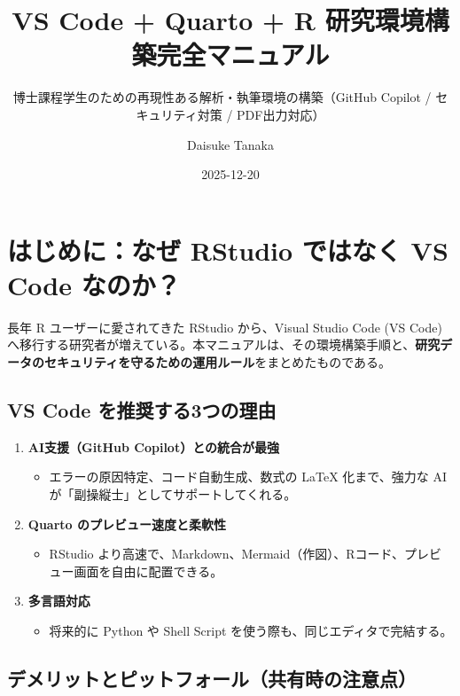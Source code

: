 \documentclass[
  pandoc]{bxjsarticle}
\title{VS Code + Quarto + R 研究環境構築完全マニュアル}
\subtitle{博士課程学生のための再現性ある解析・執筆環境の構築（GitHub
Copilot / セキュリティ対策 / PDF出力対応）}
\author{Daisuke Tanaka}
\date{2025-12-20}
\providecommand{\tightlist}{%
  \setlength{\itemsep}{0pt}\setlength{\parskip}{0pt}}
\begin{document}
\maketitle


\section{はじめに：なぜ RStudio ではなく VS Code
なのか？}\label{ux306fux3058ux3081ux306bux306aux305c-rstudio-ux3067ux306fux306aux304f-vs-code-ux306aux306eux304b}

長年 R ユーザーに愛されてきた RStudio から、Visual Studio Code (VS Code)
へ移行する研究者が増えている。本マニュアルは、その環境構築手順と、\textbf{研究データのセキュリティを守るための運用ルール}をまとめたものである。

\subsection{VS Code
を推奨する3つの理由}\label{vs-code-ux3092ux63a8ux5968ux3059ux308b3ux3064ux306eux7406ux7531}

\begin{enumerate}
\def\labelenumi{\arabic{enumi}.}
\tightlist
\item
  \textbf{AI支援（GitHub Copilot）との統合が最強}

  \begin{itemize}
  \tightlist
  \item
    エラーの原因特定、コード自動生成、数式の LaTeX 化まで、強力な AI
    が「副操縦士」としてサポートしてくれる。
  \end{itemize}
\item
  \textbf{Quarto のプレビュー速度と柔軟性}

  \begin{itemize}
  \tightlist
  \item
    RStudio
    より高速で、Markdown、Mermaid（作図）、Rコード、プレビュー画面を自由に配置できる。
  \end{itemize}
\item
  \textbf{多言語対応}

  \begin{itemize}
  \tightlist
  \item
    将来的に Python や Shell Script を使う際も、同じエディタで完結する。
  \end{itemize}
\end{enumerate}

\subsection{デメリットとピットフォール（共有時の注意点）}\label{ux30c7ux30e1ux30eaux30c3ux30c8ux3068ux30d4ux30c3ux30c8ux30d5ux30a9ux30fcux30ebux5171ux6709ux6642ux306eux6ce8ux610fux70b9}
\end{document}
